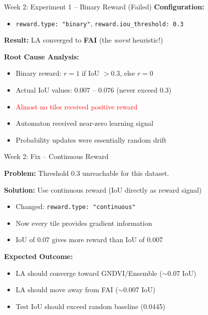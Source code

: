 \documentclass[10pt,xcolor={table,dvipsnames},t]{beamer}
\begin{document}
\begin{frame}{Week 2: Experiment 1 -- Binary Reward (Failed)}
\small
\textbf{Configuration:}
\begin{itemize}
  \item \texttt{reward.type: "binary"}, \texttt{reward.iou\_threshold: 0.3}
\end{itemize}

\vspace{0.3em}
\textbf{Result:} LA converged to \textbf{FAI} (the \emph{worst} heuristic!)

\vspace{0.3em}
\textbf{Root Cause Analysis:}
\begin{itemize}
  \item Binary reward: $r = 1$ if IoU $> 0.3$, else $r = 0$
  \item Actual IoU values: 0.007 -- 0.076 (never exceed 0.3)
  \item \textcolor{red}{Almost no tiles received positive reward}
  \item Automaton received near-zero learning signal
  \item Probability updates were essentially random drift
\end{itemize}

\end{frame}

\begin{frame}{Week 2: Fix -- Continuous Reward}

\textbf{Problem:} Threshold 0.3 unreachable for this dataset.

\vspace{0.5em}
\textbf{Solution:} Use continuous reward (IoU directly as reward signal)
\begin{itemize}
  \item Changed: \texttt{reward.type: "continuous"}
  \item Now every tile provides gradient information
  \item IoU of 0.07 gives more reward than IoU of 0.007
\end{itemize}

\vspace{0.5em}
\textbf{Expected Outcome:}
\begin{itemize}
  \item LA should converge toward GNDVI/Ensemble ($\sim$0.07 IoU)
  \item LA should move away from FAI ($\sim$0.007 IoU)
  \item Test IoU should exceed random baseline (0.0445)
\end{itemize}

\end{frame}
\end{document}
